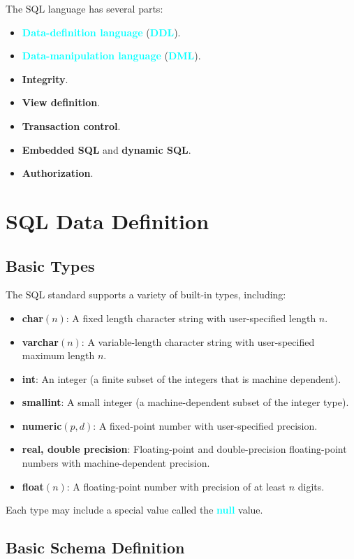 \documentclass[a4paper,12pt,twoside,openany]{book}
\newcommand{\textcy}[1]{\textbf{\textcolor{cyan}{#1}}}
\begin{document}
The SQL language has several parts:
\begin{itemize}
    \item\textcy{Data-definition language} (\textcy{DDL}).
    \item\textcy{Data-manipulation language} (\textcy{DML}).
    \item\textbf{Integrity}.
    \item\textbf{View definition}.
    \item\textbf{Transaction control}.
    \item\textbf{Embedded SQL} and \textbf{dynamic SQL}.
    \item\textbf{Authorization}.
\end{itemize}

\section{SQL Data Definition}
\label{section:3.2}
\subsection{Basic Types}

The SQL standard supports a variety of built-in types, including:
\begin{itemize}
    \item\textbf{char}$(n)$: A fixed length character string with user-specified length $n$.
    \item\textbf{varchar}$(n)$: A variable-length character string with user-specified maximum length $n$.
    \item\textbf{int}: An integer (a finite subset of the integers that is machine dependent).
    \item\textbf{smallint}: A small integer (a machine-dependent subset of the integer type).
    \item\textbf{numeric}$(p,d)$: A fixed-point number with user-specified precision.
    \item\textbf{real, double precision}: Floating-point and double-precision floating-point numbers with machine-dependent precision.
    \item\textbf{float}$(n)$: A floating-point number with precision of at least $n$ digits.
\end{itemize}

Each type may include a special value called the \textcy{null} value.

\subsection{Basic Schema Definition}
\end{document}
